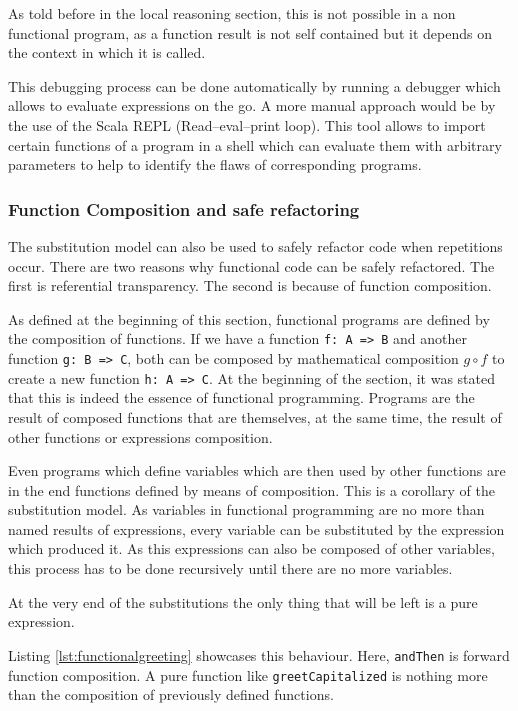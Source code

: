 \documentclass[../main.tex]{subfiles}
\begin{document}
As told before in the local reasoning section, this is not possible in a non
functional program, as a function result is not self contained but it depends on
the context in which it is called.

This debugging process can be done automatically by running a debugger which allows to
evaluate expressions on the go. A more manual approach would be by the use of
the Scala REPL (Read–eval–print loop). This tool allows to import
certain functions of a program in a shell which can evaluate them with arbitrary
parameters to help to identify the flaws of corresponding programs.

\subsubsection{Function Composition and safe refactoring}

The substitution model can also be used to safely refactor code when repetitions
occur. There are two reasons why functional code can be safely refactored.
The first is referential transparency. The second is because of function
composition.

As defined at the beginning of this section, functional programs are defined by
the composition of functions. If we have a function \texttt{f: A => B} and
another function \texttt{g: B => C}, both can be composed by mathematical
composition $g \circ f$ to create a new function \texttt{h: A => C}. At the
beginning of the section, it was stated that this is indeed the essence of
functional programming. Programs are the result of composed functions that are themselves,
at the same time, the result of other functions or expressions composition.

Even programs which define variables which are then used by other functions are
in the end functions defined by means of composition. This is a corollary of the
substitution model. As variables in functional programming are no more than
named results of expressions, every variable can be substituted by the expression
which produced it. As this expressions can also be composed of other variables,
this process has to be done recursively until there are no more variables.

At the very end of the substitutions the only thing that will be left is a pure
expression.

Listing \ref{lst:functionalgreeting} showcases this behaviour. Here, \texttt{andThen} is 
forward function composition. A pure function
like \texttt{greetCapitalized} is nothing more than the composition of previously defined
functions.
\end{document}
